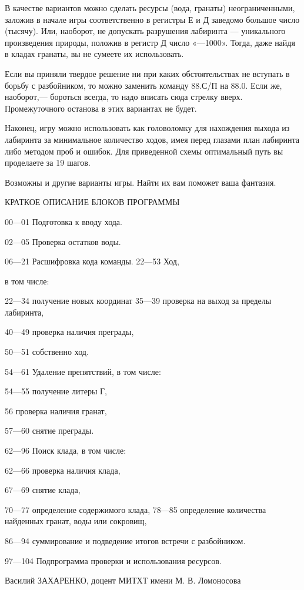 \documentclass[11pt,a4paper,oneside]{article}
\begin{document}
В качестве вариантов можно сделать ресурсы (вода, гранаты) неограниченными, заложив в начале игры соответственно в регистры Е и Д заведомо большое число (тысячу). Или, наоборот, не допускать разрушения лабиринта — уникального произведения природы, положив в регистр Д число «—1000». Тогда, даже найдя в кладах гранаты, вы не сумеете их использовать.

Если вы приняли твердое решение ни при каких обстоятельствах не вступать в борьбу с разбойником, то можно заменить команду 88.С/П на 88.0. Если же, наоборот,— бороться всегда, то надо вписать сюда стрелку вверх. Промежуточного останова в этих вариантах не будет.

Наконец, игру можно использовать как головоломку для нахождения выхода из лабиринта за минимальное количество ходов, имея перед глазами план лабиринта либо методом проб и ошибок. Для приведенной схемы оптимальный путь вы проделаете за 19 шагов.

Возможны и другие варианты игры. Найти их вам поможет ваша фантазия.

КРАТКОЕ ОПИСАНИЕ БЛОКОВ ПРОГРАММЫ

00—01 Подготовка к вводу хода.

02—05 Проверка остатков воды.

06—21 Расшифровка кода команды. 22—53 Ход,

в том числе:

22—34 получение новых координат 35—39 проверка на выход за пределы лабиринта,

40—49 проверка наличия преграды,

50—51 собственно ход.

54—61 Удаление препятствий, в том числе:

54—55 получение литеры Г,

56 проверка наличия гранат,

57—60 снятие преграды.

62—96 Поиск клада, в том числе:

62—66 проверка наличия клада,

67—69 снятие клада,

70—77 определение содержимого клада, 78—85 определение количества найденных гранат, воды или сокровищ,

86—94 суммирование и подведение итогов встречи с разбойником.

97—104 Подпрограмма проверки и использования ресурсов.

Василий ЗАХАРЕНКО,
доцент МИТХТ имени М. В. Ломоносова
\end{document}
